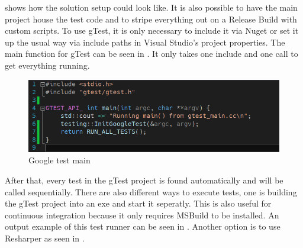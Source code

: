      shows how the solution setup could look like. 
    It is also possible to have the main project house the test code and to stripe everything out on a Release Build with custom scripts. 
    To use gTest, it is only necessary to include it via Nuget or set it up the usual way via include paths in Visual Studio's project properties. 
    The main function for gTest can be seen in . It only takes one include and one call to get everything running.
    
    \begin{figure}[hbtp]
        \centering
        \includegraphics[width=\columnwidth]{img/gtestMain.PNG}
        \caption{Google test main}
        \label{fig:gtestMain}
    \end{figure}

    After that, every test in the gTest project is found automatically and will be called sequentially.
    There are also different ways to execute tests,
    one is building the gTest project into an exe and start it seperatly. This is also useful for continuous integration because it only requires MSBuild to be installed.
    An output example of this test runner can be seen in . 
    Another option is to use Resharper as seen in .
   
